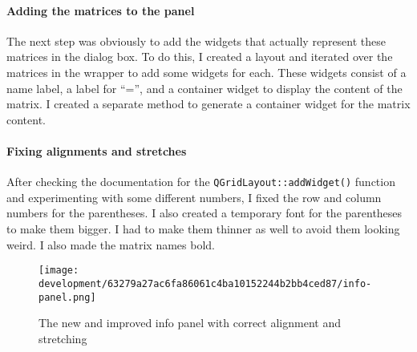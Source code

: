 \documentclass[../development.tex]{subfiles}
\begin{document}
\paragraph{Adding the matrices to the panel\label{development:teacher-suggestions:adding-the-info-panel:adding-the-matrices-to-the-panel}}

The next step was obviously to add the widgets that actually represent these matrices in the dialog box. To do this, I created a layout and iterated over the matrices in the wrapper to add some widgets for each. These widgets consist of a name label, a label for \enquote{=}, and a container widget to display the content of the matrix. I created a separate method to generate a container widget for the matrix content.



\paragraph{Fixing alignments and stretches\label{development:teacher-suggestions:adding-the-info-panel:fixing-alignments-and-stretches}}

After checking the documentation for the \texttt{QGridLayout::addWidget()} function\cite{qt5-docs-qgridlayout-addwidget} and experimenting with some different numbers, I fixed the row and column numbers for the parentheses. I also created a temporary font for the parentheses to make them bigger. I had to make them thinner as well to avoid them looking weird. I also made the matrix names bold.


\begin{figure}[H]
	\centering
	\texttt{[image: development/63279a27ac6fa86061c4ba10152244b2bb4ced87/info-panel.png]}
	\caption{The new and improved info panel with correct alignment and stretching}
	\label{fig:development:63279a27ac6fa86061c4ba10152244b2bb4ced87:info-panel.png}
\end{figure}
\end{document}
